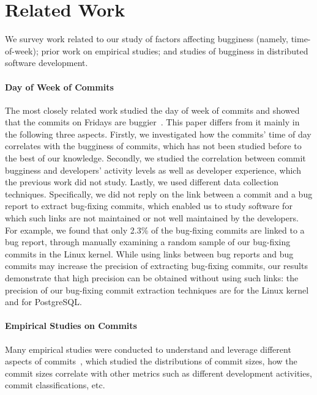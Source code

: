 \section{Related Work}
\label{sec-related}
We survey work related to our study of factors affecting bugginess
(namely, time-of-week); prior work on empirical studies; and studies
of bugginess in distributed software development.

\paragraph{Day of Week of Commits}
The most closely related work studied the day of week of commits and
showed that the commits on Fridays are buggier~\cite{sliwerski-msr-2005}. 
This paper differs from it mainly in the following three aspects.
Firstly, we investigated how the commits' time of day correlates with the bugginess of commits, 
which has not been studied before to the best of our knowledge.
Secondly, we studied the correlation between commit bugginess and developers' activity levels as well as 
developer experience, which the previous work did not study.
Lastly, we used different data collection techniques. Specifically, we did not reply on the link 
between a commit and a bug report to extract bug-fixing commits, which enabled us to study 
software for which such links are not maintained or not well maintained by the developers. For example, we 
found that only 2.3\% of the bug-fixing commits are linked to a bug report, 
through manually examining a random sample of our bug-fixing commits in the Linux kernel.
While using links between bug reports and bug commits may increase the precision of extracting 
bug-fixing commits, our results demonstrate that 
high precision can be obtained without using such links: 
the precision of our bug-fixing commit extraction techniques are 
\linuxP for the Linux kernel and \postP for PostgreSQL.

\paragraph{Empirical Studies on Commits}
Many empirical studies were conducted to understand and leverage different aspects of 
commits~\cite{hattori2008nature,largeCommits,commitTextualClassification, smallCommits05, Swanson76}, which 
studied the distributions of commit sizes, how the commit sizes correlate with other metrics 
such as different development activities, commit classifications, etc. 

